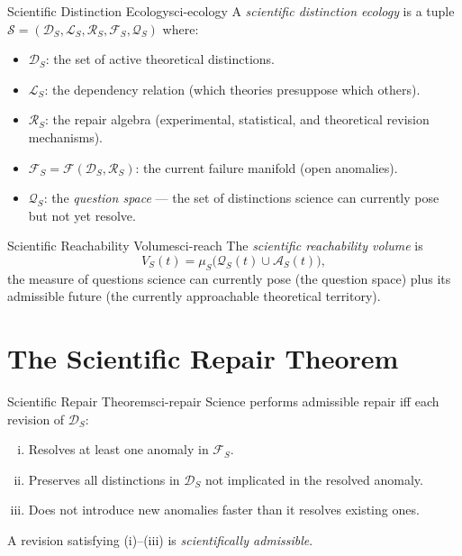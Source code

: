 \documentclass[12pt,twoside,openright]{book}
\newcommand{\adm}{\mathcal{A}}
\begin{document}
\begin{definition}{Scientific Distinction Ecology}{sci-ecology}
  A \emph{scientific distinction ecology} is a tuple
  $\mathcal{S} = (\mathcal{D}_S, \mathcal{L}_S,
  \mathcal{R}_S, \mathcal{F}_S, \mathcal{Q}_S)$ where:
  \begin{itemize}[nosep]
    \item $\mathcal{D}_S$: the set of active theoretical
          distinctions.
    \item $\mathcal{L}_S$: the dependency relation
          (which theories presuppose which others).
    \item $\mathcal{R}_S$: the repair algebra
          (experimental, statistical, and theoretical
          revision mechanisms).
    \item $\mathcal{F}_S = \mathcal{F}(\mathcal{D}_S,
          \mathcal{R}_S)$: the current failure manifold
          (open anomalies).
    \item $\mathcal{Q}_S$: the \emph{question space} —
          the set of distinctions science can currently
          pose but not yet resolve.
  \end{itemize}
\end{definition}

\begin{definition}{Scientific Reachability Volume}{sci-reach}
  The \emph{scientific reachability volume} is
  \[
    V_S(t)
    = \mu_S\!\bigl(\mathcal{Q}_S(t) \cup \adm_S(t)\bigr),
  \]
  the measure of questions science can currently pose
  (the question space) plus its admissible future
  (the currently approachable theoretical territory).
\end{definition}

\section{The Scientific Repair Theorem}

\begin{theorem}{Scientific Repair Theorem}{sci-repair}
  Science performs admissible repair iff each revision
  of $\mathcal{D}_S$:
  \begin{enumerate}[(i)]
    \item Resolves at least one anomaly in $\mathcal{F}_S$.
    \item Preserves all distinctions in $\mathcal{D}_S$
          not implicated in the resolved anomaly.
    \item Does not introduce new anomalies faster than
          it resolves existing ones.
  \end{enumerate}
  A revision satisfying (i)--(iii) is
  \emph{scientifically admissible}.
\end{theorem}
\end{document}

